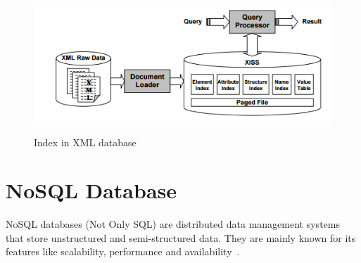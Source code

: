\begin{figure}[h]
    \includegraphics[width=1\textwidth]{img/Indexing}
    \label{fig:xml-indexes}
    \caption{Index in XML database~\cite{li2001indexing}}
\end{figure}

	\section{NoSQL Database}
	NoSQL databases (Not Only SQL) are distributed data management systems that store unstructured and semi-structured data. They are mainly known for its features like scalability, performance and availability~\citep{hecht2011nosql}.
	
